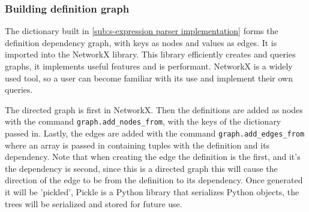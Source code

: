 
\subsubsection{Building definition graph}

The dictionary built in \cref{sub:s-expression parser implementation} forms the
definition dependency graph, with keys as nodes and values as edges. It is
imported into the NetworkX library. This library efficiently creates and
queries graphs, it implements useful features and is performant. NetworkX is a
widely used tool, so a user can become familiar with its use and
implement their own queries. 

 The directed
graph is first in NetworkX. Then the definitions are added as nodes with the
command \texttt{graph.add\_nodes\_from}, with the keys of the dictionary passed
in. Lastly, the edges are added with the command
\texttt{graph.add\_edges\_from} where an array is passed in containing tuples
with the definition and its dependency. Note that when creating the edge the
definition is the first, and it's the dependency is second, since this is a
directed graph this will cause the direction of the edge to be from the
definition to its dependency.  Once generated it will be 'pickled', Pickle is a
Python library that serializes Python objects, the trees will be serialized and
stored for future use. 

